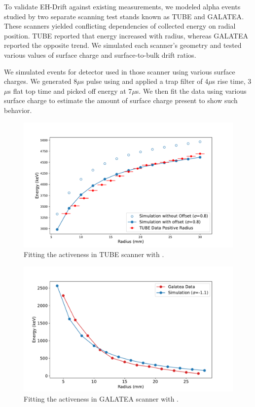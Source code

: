 To validate EH-Drift against existing measurements, we modeled alpha events studied by two separate scanning test stands known as TUBE\cite{tube_paper} and GALATEA\cite{galatea_paper}. These scanners yielded conflicting dependencies of collected energy on radial position. TUBE reported that energy increased with radius, whereas GALATEA reported the opposite trend. We simulated each scanner’s geometry and tested various values of surface charge and surface-to-bulk drift ratios. 

We simulated events for detector used in those scanner using various surface charges. We generated 8$\mu$s pulse using {\tdsim} and applied a trap filter of 4$\mu$s rise time, 3$\mu$s flat top time and picked off energy at 7$\mu$s. We then fit the data using various surface charge to estimate the amount of surface charge present to show such behavior.


\begin{figure}

\includegraphics[trim={0.3cm 0.1cm 1.7cm 0.1cm},clip,width=\linewidth]{ch5/figs/tube_fit.pdf}
\caption{Fitting the activeness in TUBE scanner with \tdsim{}.}
\label{fig:tube_fit}
\end{figure}


\begin{figure}

\includegraphics[trim={0.3cm 0.1cm 1.7cm 0.1cm},clip,width=\linewidth]{ch5/figs/gal_fit.pdf}
\caption{Fitting the activeness in GALATEA scanner with \tdsim{}.}
\label{fig:gal_fit}
\end{figure}

